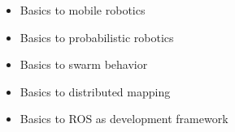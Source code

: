 \begin{itemize}
	\item{Basics to mobile robotics}
	\item{Basics to probabilistic robotics}
	\item{Basics to swarm behavior}
	\item{Basics to distributed mapping}
	\item{Basics to ROS as development framework}
\end{itemize}
